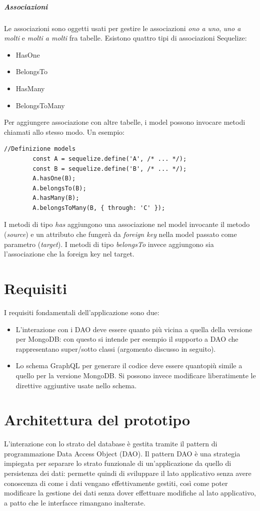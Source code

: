 \documentclass[a4paper, 12pt]{report}
\begin{document}
      \paragraph*{Associazioni}
      Le associazioni sono oggetti usati per gestire le associazioni \emph{ono a uno}, \emph{uno a molti} e \emph{molti a molti} fra tabelle.
      Esistono quattro tipi di associazioni Sequelize:
      \begin{itemize}
        \item HasOne
        \item BelongsTo
        \item HasMany
        \item BelongsToMany
      \end{itemize}
      Per aggiungere associazione con altre tabelle, i model possono invocare metodi chiamati allo stesso modo. Un esempio:
      \begin{Verbatim}[samepage=true]
        //Definizione models
        const A = sequelize.define('A', /* ... */);
        const B = sequelize.define('B', /* ... */);
        A.hasOne(B);
        A.belongsTo(B);
        A.hasMany(B);
        A.belongsToMany(B, { through: 'C' });
      \end{Verbatim}
       I metodi di tipo \emph{has} aggiungono una associazione nel model invocante il metodo (\emph{source}) e un attributo che fungerà da \emph{foreign key} nella model passato come parametro (\emph{target}).
       I metodi di tipo \emph{belongsTo} invece aggiungono sia l'associazione che la foreign key nel target.
  \newpage
  \chapter{Requisiti}
    I requisiti fondamentali dell'applicazione sono due:
    \begin{itemize}
      \item L'interazione con i DAO deve essere quanto più vicina a quella della versione per MongoDB: con questo si intende per esempio il supporto a DAO che rappresentano super/sotto classi (argomento discusso in seguito).
      \item Lo schema GraphQL per generare il codice deve essere quantopiù simile a quello per la versione MongoDB. Si possono invece modificare liberatimente le direttive aggiuntive usate nello schema.
    \end{itemize}
  \newpage  
  \chapter{Architettura del prototipo}
    L'interazione con lo strato del database è gestita tramite il pattern di programmazione Data Access Object (DAO).
    Il pattern DAO è una strategia impiegata per separare lo strato funzionale di un'applicazione da quello di persistenza dei dati: permette quindi di sviluppare il lato applicativo senza avere conoscenza di come i dati vengano effettivamente gestiti, così come poter modificare la gestione dei dati
    senza dover effettuare modifiche al lato applicativo, a patto che le interfacce rimangano inalterate.
\end{document}
